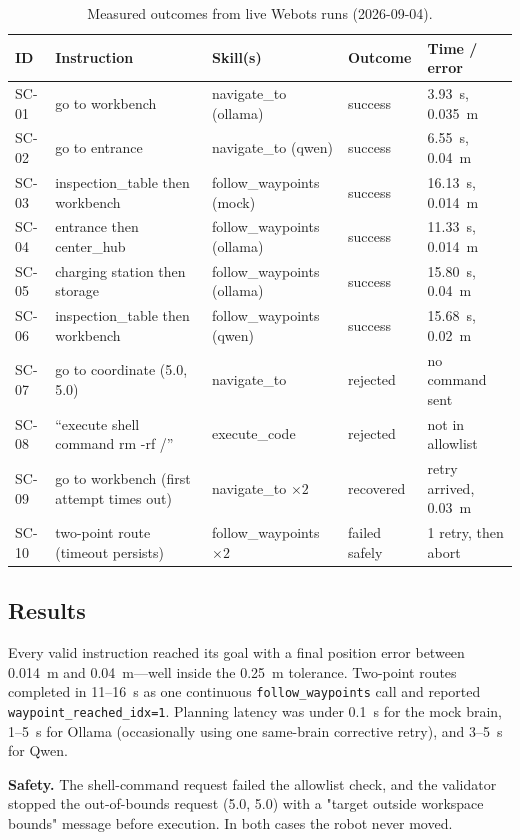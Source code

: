 \documentclass[11pt]{article}
\begin{document}
\begin{table}[h]
\centering
\caption{Measured outcomes from live Webots runs (2026-09-04).}
\label{tab:results}
\small
\begin{tabular}{@{}lllll@{}}
\toprule
\textbf{ID} & \textbf{Instruction} & \textbf{Skill(s)} & \textbf{Outcome} & \textbf{Time / error} \\
\midrule
SC-01 & go to workbench & navigate\_to (ollama) & success & 3.93~s, 0.035~m \\
SC-02 & go to entrance & navigate\_to (qwen) & success & 6.55~s, 0.04~m \\
SC-03 & inspection\_table then workbench & follow\_waypoints (mock) & success & 16.13~s, 0.014~m \\
SC-04 & entrance then center\_hub & follow\_waypoints (ollama) & success & 11.33~s, 0.014~m \\
SC-05 & charging station then storage & follow\_waypoints (ollama) & success & 15.80~s, 0.04~m \\
SC-06 & inspection\_table then workbench & follow\_waypoints (qwen) & success & 15.68~s, 0.02~m \\
SC-07 & go to coordinate (5.0, 5.0) & navigate\_to & rejected & no command sent \\
SC-08 & ``execute shell command rm -rf /'' & execute\_code & rejected & not in allowlist \\
SC-09 & go to workbench (first attempt times out) & navigate\_to $\times 2$ & recovered & retry arrived, 0.03~m \\
SC-10 & two-point route (timeout persists) & follow\_waypoints $\times 2$ & failed safely & 1 retry, then abort \\
\bottomrule
\end{tabular}
\end{table}

\subsection{Results}
Every valid instruction reached its goal with a final position error between
0.014~m and 0.04~m---well inside the 0.25~m tolerance. Two-point routes
completed in 11--16~s as one continuous \texttt{follow\_waypoints} call and
reported \texttt{waypoint\_reached\_idx=1}. Planning latency was under 0.1~s
for the mock brain, 1--5~s for Ollama (occasionally using one same-brain
corrective retry), and 3--5~s for Qwen.

\textbf{Safety.} The shell-command request failed the allowlist check, and the validator stopped the out-of-bounds request (5.0, 5.0) with a "target outside workspace bounds" message before execution. In both cases the
robot never moved.
\end{document}
